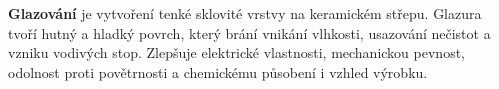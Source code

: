 \textbf{Glazování} je vytvoření tenké sklovité vrstvy na keramickém střepu. Glazura tvoří hutný a hladký povrch, který brání vnikání vlhkosti, usazování nečistot a vzniku vodivých stop. Zlepšuje elektrické vlastnosti, mechanickou pevnost, odolnost proti povětrnosti a chemickému působení i vzhled výrobku.
